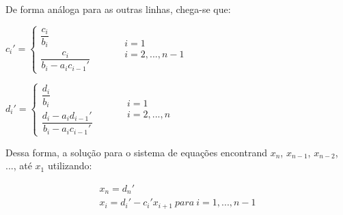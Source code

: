 De forma análoga para as outras linhas, chega-se que:

\begin{center}
	\begin{math}
		c_i' = 
		\left\{
    		\begin{array}{l}
      			\dfrac{c_i}{b_i}  \\
				\dfrac{c_i}{b_i - a_i c_{i-1}'}
			\end{array}
    		\begin{array}{l}
      		\qquad \\
			\qquad \\
			\qquad	   
    		\end{array}
    		\begin{array}{l}
    			i = 1 \\
      			i = 2, ... , n-1
    		\end{array}
		\right.	
	\end{math}
\end{center} 
\begin{center}
	\begin{math}
		d_i' = 
		\left\{
    		\begin{array}{l}
      			\dfrac{d_i}{b_i}  \\
				\dfrac{d_i - a_i d_{i-1}'}{b_i - a_i c_{i-1}'}
			\end{array}
    		\begin{array}{l}
      			\qquad \\
				\qquad \\
				\qquad	   
    		\end{array}
    		\begin{array}{l}
    			i = 1 \\
      			i = 2, ... , n
    		\end{array}
		\right.
	\end{math}
\end{center} 

Dessa forma, a solução para o sistema de equações encontrand $x_n$, $x_{n-1}$, $x_{n-2}$, ..., até $x_1$ utilizando:

\begin{gather*}
	x_n = d_n' \\
	x_i = d_i' - c_i' x_{i+1} \ para \ i = 1, ..., n-1
\end{gather*}